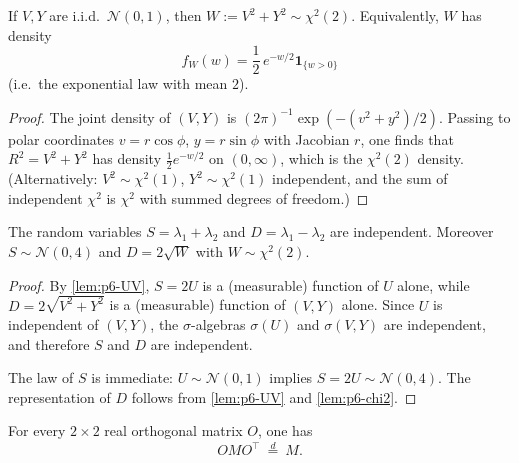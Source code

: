 \documentclass[11pt,a4paper]{article}
\begin{document}
\begin{lemma}
\label{lem:p6-chi2}
If \(V,Y\) are i.i.d.\ \(\mathcal{N}(0,1)\), then \(W:=V^2+Y^2\sim\chi^2(2)\). Equivalently, \(W\) has density
\[
f_W(w)
=
\frac12\,e^{-w/2}\mathbf{1}_{\{w>0\}}
\]
(i.e.\ the exponential law with mean \(2\)).
\end{lemma}

\begin{proof}
The joint density of \((V,Y)\) is \((2\pi)^{-1}\exp(-(v^2+y^2)/2)\). Passing to polar coordinates \(v=r\cos\phi\), \(y=r\sin\phi\) with Jacobian \(r\), one finds that \(R^2=V^2+Y^2\) has density \(\frac12 e^{-w/2}\) on \((0,\infty)\), which is the \(\chi^2(2)\) density. (Alternatively: \(V^2\sim\chi^2(1)\), \(Y^2\sim\chi^2(1)\) independent, and the sum of independent \(\chi^2\) is \(\chi^2\) with summed degrees of freedom.)
\end{proof}

\begin{proposition}
\label{prop:p6-SD}
The random variables \(S=\lambda_1+\lambda_2\) and \(D=\lambda_1-\lambda_2\) are independent. Moreover \(S\sim\mathcal{N}(0,4)\) and \(D=2\sqrt{W}\) with \(W\sim\chi^2(2)\).
\end{proposition}

\begin{proof}
By \cref{lem:p6-UV}, \(S=2U\) is a (measurable) function of \(U\) alone, while \(D=2\sqrt{V^2+Y^2}\) is a (measurable) function of \((V,Y)\) alone. Since \(U\) is independent of \((V,Y)\), the \(\sigma\)-algebras \(\sigma(U)\) and \(\sigma(V,Y)\) are independent, and therefore \(S\) and \(D\) are independent.

The law of \(S\) is immediate: \(U\sim\mathcal{N}(0,1)\) implies \(S=2U\sim\mathcal{N}(0,4)\). The representation of \(D\) follows from \cref{lem:p6-UV} and \cref{lem:p6-chi2}.
\end{proof}

\begin{lemma}
\label{lem:p6-goe}
For every \(2\times 2\) real orthogonal matrix \(O\), one has
\[
OMO^\top\ \stackrel{d}{=}\ M.
\]
\end{lemma}
\end{document}
